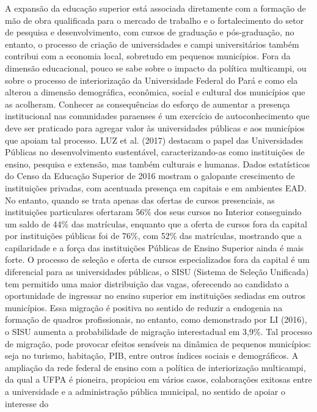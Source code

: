 \documentclass[]{article}
\begin{document}
A expansão da educação superior está associada diretamente com a
formação de mão de obra qualificada para o mercado de trabalho e o
fortalecimento do setor de pesquisa e desenvolvimento, com cursos de
graduação e pós-graduação, no entanto, o processo de criação de
universidades e campi universitários também contribui com a economia
local, sobretudo em pequenos municípios. Fora da dimensão educacional,
pouco se sabe sobre o impacto da política multicampi, ou sobre o
processo de interiorização da Universidade Federal do Pará e como ela
alterou a dimensão demográfica, econômica, social e cultural dos
municípios que as acolheram. Conhecer as consequências do esforço de
aumentar a presença institucional nas comunidades paraenses é um
exercício de autoconhecimento que deve ser praticado para agregar valor
às universidades públicas e aos municípios que apoiam tal processo. LUZ
et al. (2017) destacam o papel das Universidades Públicas no
desenvolvimento sustentável, caracterizando-as como instituições de
ensino, pesquisa e extensão, mas também culturais e humanas. Dados
estatísticos do Censo da Educação Superior de 2016 mostram o galopante
crescimento de instituições privadas, com acentuada presença em capitais
e em ambientes EAD. No entanto, quando se trata apenas das ofertas de
cursos presenciais, as instituições particulares ofertaram 56\% dos seus
cursos no Interior conseguindo um saldo de 44\% das matrículas, enquanto
que a oferta de cursos fora da capital por instituições públicas foi de
76\%, com 52\% das matrículas, mostrando que a capilaridade e a força
das instituições Públicas de Ensino Superior ainda é mais forte. O
processo de seleção e oferta de cursos especializados fora da capital é
um diferencial para as universidades públicas, o SISU (Sistema de
Seleção Unificada) tem permitido uma maior distribuição das vagas,
oferecendo ao candidato a oportunidade de ingressar no ensino superior
em instituições sediadas em outros municípios. Essa migração é positiva
no sentido de reduzir a endogenia na formação de quadros profissionais,
no entanto, como demonstrado por LI (2016), o SISU aumenta a
probabilidade de migração interestadual em 3,9\%. Tal processo de
migração, pode provocar efeitos sensíveis na dinâmica de pequenos
municípios: seja no turismo, habitação, PIB, entre outros índices
sociais e demográficos. A ampliação da rede federal de ensino com a
política de interiorização multicampi, da qual a UFPA é pioneira,
propiciou em vários casos, colaborações exitosas entre a universidade e
a administração pública municipal, no sentido de apoiar o interesse do
\end{document}
